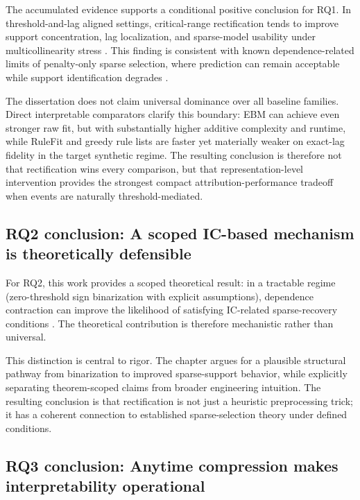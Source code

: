 The accumulated evidence supports a conditional positive conclusion for RQ1. In threshold-and-lag aligned settings, critical-range rectification tends to improve support concentration, lag localization, and sparse-model usability under multicollinearity stress \autocite{orender2022,JOrender2025Efficient}. This finding is consistent with known dependence-related limits of penalty-only sparse selection, where prediction can remain acceptable while support identification degrades \autocite{PZhao2006model,freijeirogonzalez2022}.

The dissertation does not claim universal dominance over all baseline families. Direct interpretable comparators clarify this boundary: EBM can achieve even stronger raw fit, but with substantially higher additive complexity and runtime, while RuleFit and greedy rule lists are faster yet materially weaker on exact-lag fidelity in the target synthetic regime. The resulting conclusion is therefore not that rectification wins every comparison, but that representation-level intervention provides the strongest compact attribution-performance tradeoff when events are naturally threshold-mediated.

\subsection{RQ2 conclusion: A scoped IC-based mechanism is theoretically defensible}

For RQ2, this work provides a scoped theoretical result: in a tractable regime (zero-threshold sign binarization with explicit assumptions), dependence contraction can improve the likelihood of satisfying IC-related sparse-recovery conditions \autocite{PZhao2006model,JOrender2025Efficient}. The theoretical contribution is therefore mechanistic rather than universal.

This distinction is central to rigor. The chapter argues for a plausible structural pathway from binarization to improved sparse-support behavior, while explicitly separating theorem-scoped claims from broader engineering intuition. The resulting conclusion is that rectification is not just a heuristic preprocessing trick; it has a coherent connection to established sparse-selection theory under defined conditions.


\subsection{RQ3 conclusion: Anytime compression makes interpretability operational}

